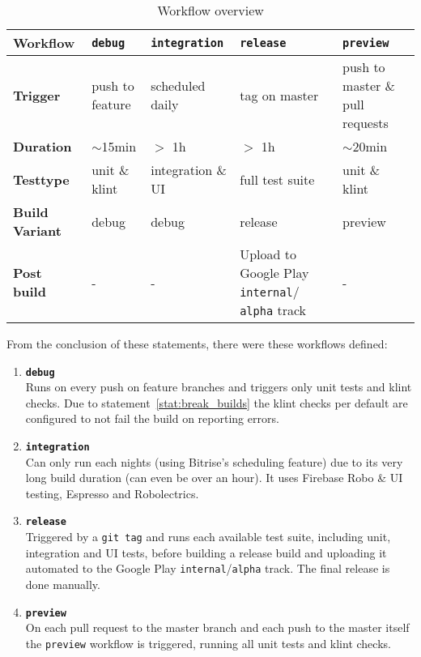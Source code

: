 \begin{table}[htb]
	\renewcommand{\arraystretch}{1.3}
	\caption{Workflow overview}
	\label{tab:overview_workflows}
	\centering
	\begin{tabular}{|p{31pt}||p{45pt}|p{50pt}|p{45pt}|p{45pt}|}
		\hline
		\textbf{Workflow} & \textbf{\texttt{debug}} & \textbf{\texttt{integration}} & \textbf{\texttt{release}} & \textbf{\texttt{preview}} \\ \hline \hline
		\textbf{Trigger} & push to feature & scheduled daily & tag on master & push to master \& pull requests \\ \hline
		\textbf{Duration} & $\sim$15min & $>$ 1h & $>$ 1h & $\sim$20min \\ \hline
		\textbf{Testtype} & unit \& klint & integration \& UI & full test suite & unit \& klint \\ \hline
		\textbf{Build Variant} & debug & debug & release & preview \\ \hline
		\textbf{Post build} & - & - & Upload to Google Play \texttt{internal}/ \texttt{alpha} track & - \\ \hline
	\end{tabular}
\end{table}

From the conclusion of these statements, there were these workflows defined:

\begin{enumerate}
	\item \textbf{\texttt{debug}}\\
	Runs on every push on feature branches and triggers only unit tests and klint checks. Due to statement~\ref{stat:break_builds} the klint checks per default are configured to not fail the build on reporting errors.
	\item \textbf{\texttt{integration}}\\
	Can only run each nights (using Bitrise's scheduling feature) due to its very long build duration (can even be over an hour). It uses Firebase Robo \& UI testing, Espresso and Robolectrics.
	\item \textbf{\texttt{release}}\\
	Triggered by a \texttt{git tag} and runs each available test suite, including unit, integration and UI tests, before building a release build and uploading it automated to the Google Play \texttt{internal}/\texttt{alpha} track. The final release is done manually.
	\item \textbf{\texttt{preview}}\\
	On each pull request to the master branch and each push to the master itself the \texttt{preview} workflow is triggered, running all unit tests and klint checks.
\end{enumerate}

